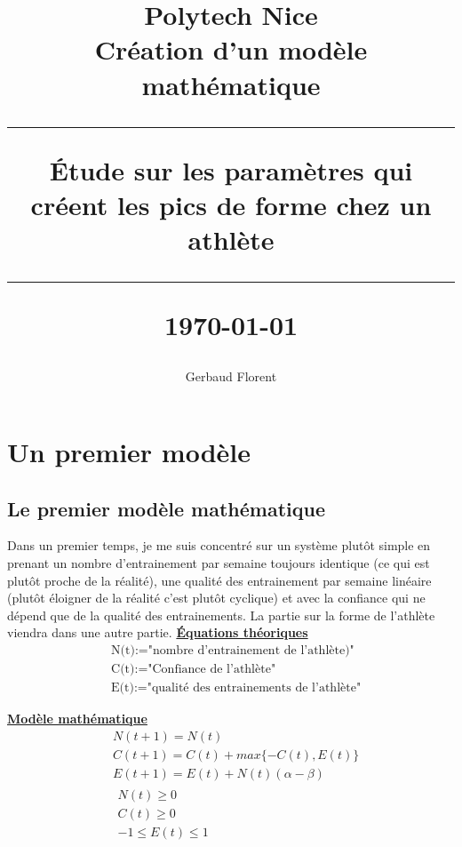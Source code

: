 \documentclass[
]{article}
\title{\textbf{\Huge Polytech Nice}\\[1cm]
	\textbf{\LARGE Création d'un modèle mathématique}\\[2cm]
	\hrule height 1pt
	\vspace{0.5cm}
	\textbf{\Large Étude sur les paramètres qui créent les pics de forme chez un athlète}\\[0.5cm]
	\hrule height 1pt
	\vspace{3cm}
	\small{\today}}
\author{
	\begin{tabular}{c}
		Gerbaud Florent \\
	\end{tabular}
}
\date{}
\begin{document}
	\maketitle
	\newpage
	
	{
		\setcounter{tocdepth}{3}
		\renewcommand{\contentsname}{
			\hfill
			\begin{tikzpicture}
				\node[draw, fill=white, inner sep=20pt,line width=1.5pt] {\fontsize{30}{36}\selectfont\bfseries Table des matières};
			\end{tikzpicture}
			\hfill
		}
		\tableofcontents
		\pagebreak
		
	}
	\hypertarget{s1}{%
	\section{Un premier modèle }\label{s1}}
	\hypertarget{ss1}{%
		\subsection{Le premier modèle mathématique }\label{ss1}}
		Dans un premier temps, je me suis concentré sur un système plutôt simple en prenant un nombre d'entrainement par semaine toujours identique (ce qui est plutôt proche de la réalité), une qualité des entrainement par semaine linéaire (plutôt éloigner de la réalité c'est plutôt cyclique) et avec la confiance qui ne dépend que de la qualité des entrainements.
		La partie sur la forme de l'athlète viendra dans une autre partie. 
		\newline\newline 
		\underline{\textbf{Équations théoriques}}
		\newline
		\begin{align*}
			&\text{N(t):="nombre d'entrainement de l'athlète)"} \\
			&\text{C(t):="Confiance de l'athlète"} \\
			&\text{E(t):="qualité des entrainements de l'athlète"}
		\end{align*}
		
		\underline{\textbf{Modèle mathématique}}
		\newline
		\begin{align}
			&N(t+1)=N(t) \\
			&C(t+1)=C(t)+max\{-C(t),E(t)\} \\
			&E(t+1)=E(t)+N(t)(\alpha-\beta) \\
			&\boxed{\begin{array}{c} N(t) \ge 0 \\ C(t) \ge 0 \\
			-1 \le E(t) \le 1\end{array}}
		\end{align}
	
\end{document}
